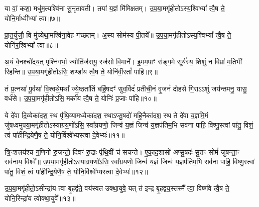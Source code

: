 {\anuvakamend[{अ॒यं वां᳚ विꣳश॒तिः॥५॥}]}

या वां॒ कशा॒ मधु॑म॒त्यश्वि॑ना सू॒नृता॑वती। तया॑ य॒ज्ञं मि॑मिक्षतम्। उ॒प॒या॒मगृ॑हीतो\-ऽस्य॒श्वि\-भ्यां᳚ त्वै॒ष ते॒ योनि॒र्माध्वी᳚भ्यां त्वा॥७॥

{\anuvakamend[{या वा॑म॒ष्टाद॑श॥६॥}]}

प्रा॒त॒र्युजौ॒ वि मु॑च्येथा॒मश्वि॑ना॒वेह ग॑च्छतम्। अ॒स्य सोम॑स्य पी॒तये᳚॥ उ॒प॒या॒मगृ॑हीतो\-ऽस्य॒श्वि\-भ्यां᳚ त्वै॒ष ते॒ योनि॑र॒श्वि\-भ्यां᳚ त्वा॥८॥

{\anuvakamend[{प्रा॒त॒र्युजा॒वेका॒न्नविꣳ॑शतिः॥७॥}]}

अ॒यं वे॒नश्चो॑दय॒त् पृश्नि॑गर्भा॒ ज्योति॑र्जरायू॒ रज॑सो वि॒माने᳚। इ॒मम॒पाꣳ स॑ङ्ग॒मे सूर्य॑स्य॒ शिशुं॒ न विप्रा॑ म॒तिभी॑ रिहन्ति॥ उ॒प॒या॒मगृ॑हीतो\-ऽसि॒ शण्डा॑य त्वै॒ष ते॒ योनि॑र्वी॒रतां᳚ पाहि॥९॥

{\anuvakamend[{अ॒यं वे॒नः पञ्च॑विꣳशतिः॥८॥}]}

तं प्र॒त्नथा॑ पू॒र्वथा॑ वि॒श्वथे॒मथा᳚ ज्ये॒ष्ठता॑तिं बर्\mbox{}हि॒षदꣳ॑ सुव॒र्विदं॑ प्रतीची॒नं वृ॒जनं॑ दोहसे गि॒रा\-ऽ\-ऽशुं जय॑न्तमनु॒ यासु॒ वर्ध॑से। उ॒प॒या॒मगृ॑हीतो\-ऽसि॒ मर्का॑य त्वै॒ष ते॒ योनिः॑ प्र॒जाः पा॑हि॥१०॥

{\anuvakamend[{तꣳ षड्विꣳ॑शतिः॥९॥}]}

ये दे॑वा दि॒व्येका॑दश॒ स्थ पृ॑थि॒व्यामध्येका॑दश॒ स्था\-ऽप्सु॒षदो॑ महि॒नैका॑दश॒ स्थ ते दे॑वा य॒ज्ञमि॒मं जु॑षध्वमुपया॒मगृ॑हीतो\-ऽस्याग्रय॒णो॑\-ऽसि॒ स्वा᳚ग्रयणो॒ जिन्व॑ य॒ज्ञं जिन्व॑ य॒ज्ञप॑तिम॒भि सव॑ना पाहि॒ विष्णु॒स्त्वां पा॑तु॒ विशं॒ त्वं पा॑हीन्द्रि॒येणै॒ष ते॒ योनि॒र्विश्वे᳚भ्यस्त्वा दे॒वेभ्यः॑॥११॥

{\anuvakamend[{ये दे॑वा॒स्त्रिच॑त्वारिꣳशत्॥10॥}]}

त्रि॒ꣳ॒शत्त्रय॑श्च ग॒णिनो॑ रु॒जन्तो॒ दिवꣳ॑ रु॒द्राः पृ॑थि॒वीं च॑ सचन्ते। ए॒का॒द॒शासो॑ अप्सु॒षदः॑ सु॒तꣳ सोमं॑ जुषन्ता॒ꣳ॒ सव॑नाय॒ विश्वे᳚॥ उ॒प॒या॒मगृ॑हीतो\-ऽस्याग्रय॒णो॑\-ऽसि॒ स्वा᳚ग्रयणो॒ जिन्व॑ य॒ज्ञं जिन्व॑ य॒ज्ञप॑तिम॒भि सव॑ना पाहि॒ विष्णु॒स्त्वां पा॑तु॒ विशं॒ त्वं पा॑हीन्द्रि॒येणै॒ष ते॒ योनि॒र्विश्वे᳚भ्यस्त्वा दे॒वेभ्यः॑॥१२॥

{\anuvakamend[{त्रि॒ꣳ॒शद् द्विच॑त्वारिꣳशत्॥11॥}]}

उ॒प॒या॒मगृ॑हीतो॒\-ऽसीन्द्रा॑य त्वा बृ॒हद्व॑ते॒ वय॑स्वत उक्था॒युवे॒ यत् त॑ इन्द्र बृ॒हद्वय॒स्तस्मै᳚ त्वा॒ विष्ण॑वे त्वै॒ष ते॒ योनि॒रिन्द्रा॑य त्वोक्था॒युवे᳚॥१३॥

{\anuvakamend[{उ॒प॒या॒मगृ॑हीतो॒ द्वाविꣳ॑शतिः॥12॥}]}

